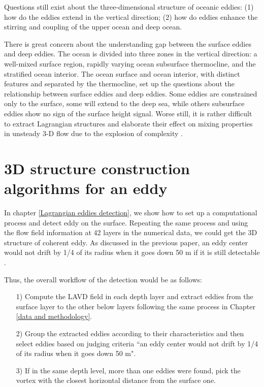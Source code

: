 Questions still exist about the three-dimensional structure of oceanic eddies: (1) how do the eddies extend in the vertical direction; (2) how do eddies enhance the stirring and coupling of the upper ocean and deep ocean.

There is great concern about the understanding gap between the surface eddies and deep eddies. The ocean is divided into three zones in the vertical direction: a well-mixed surface region, rapidly varying ocean subsurface thermocline, and the stratified ocean interior. The ocean surface and ocean interior, with distinct features and separated by the thermocline, set up the questions about the relationship between surface eddies and deep eddies. Some eddies are constrained only to the surface, some will extend to the deep sea, while others subsurface eddies show no sign of the surface height signal. Worse still, it is rather difficult to extract Lagrangian
structures and elaborate their effect on mixing properties in unsteady 3-D flow due to the explosion of complexity \cite{aref2017frontiers}.  

\section{3D structure construction algorithms for an eddy}

In chapter \ref{Lagrangian eddies detection}, we show how to set up a computational process and detect eddy on the surface. Repeating the same process and using the flow field information at 42 layers in the numerical data, we could get the 3D structure of coherent eddy. As discussed in the previous paper, an eddy center would not drift by 1/4
of its radius when it goes down 50 m if it is still detectable \cite{dong2012three}.

Thus, the overall workflow of the detection would be as follows:

\begin{itemize}
  \item [1)] 
  Compute the LAVD field in each depth layer and extract eddies from the surface layer to the other below layers following the same process in Chapter \ref{data and methodology}.
  \item [2)]
  Group the extracted eddies according to their characteristics and then  select eddies based on judging criteria ``an eddy center would not drift by 1/4 of its radius when it goes down 50 m".
  \item [3)]
  If in the same depth level, more than one eddies were found, pick the vortex with the closest horizontal distance from the surface one.
\end{itemize}


